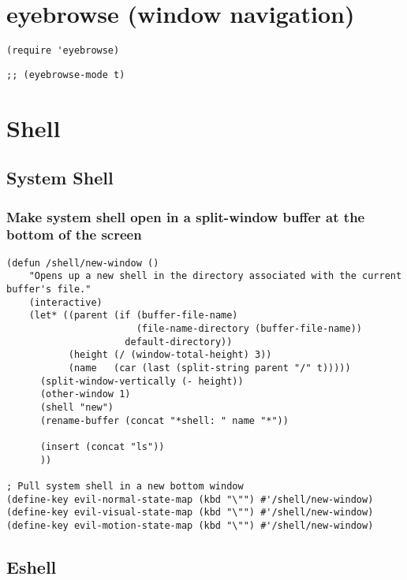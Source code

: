 \documentclass[11pt]{article}
\begin{document}
\section*{eyebrowse (window navigation)}
\label{sec:orgc38dc53}

\begin{verbatim}
(require 'eyebrowse)
\end{verbatim}

\begin{verbatim}
;; (eyebrowse-mode t)
\end{verbatim}


\section*{Shell}
\label{sec:org6850658}

\subsection*{System Shell}
\label{sec:orgb9070ed}
\subsubsection*{Make system shell open in a split-window buffer at the bottom of the screen}
\label{sec:org87f24c9}

\begin{verbatim}
(defun /shell/new-window ()
    "Opens up a new shell in the directory associated with the current buffer's file." 
    (interactive)
    (let* ((parent (if (buffer-file-name)
                       (file-name-directory (buffer-file-name))
                     default-directory))
           (height (/ (window-total-height) 3))
           (name   (car (last (split-string parent "/" t)))))
      (split-window-vertically (- height))
      (other-window 1)
      (shell "new")
      (rename-buffer (concat "*shell: " name "*"))

      (insert (concat "ls"))
      ))

; Pull system shell in a new bottom window
(define-key evil-normal-state-map (kbd "\"") #'/shell/new-window)
(define-key evil-visual-state-map (kbd "\"") #'/shell/new-window)
(define-key evil-motion-state-map (kbd "\"") #'/shell/new-window)
\end{verbatim}


\subsection*{Eshell}
\label{sec:org6d20c27}
\end{document}
